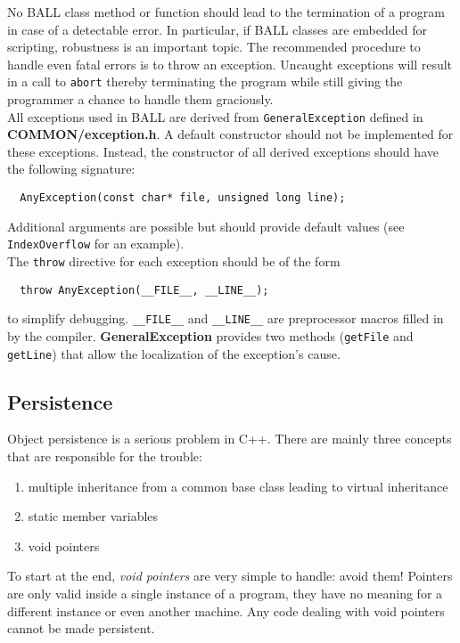 \documentclass[a4paper,10pt]{article}
\begin{document}
No BALL class method or function should lead to the termination of a program
in case of a detectable error. In particular, if BALL classes are embedded 
for scripting, robustness is an important topic. The recommended
procedure to handle even fatal errors is to throw an exception. Uncaught
exceptions will result in a call to {\tt abort} thereby terminating the
program while still giving the programmer a chance to handle them graciously.\\
All exceptions used in BALL are derived from {\tt GeneralException}
defined in {\bf COMMON/exception.h}. A default constructor should not be
implemented for these exceptions. Instead, the constructor of all derived
exceptions should have the following signature:
\begin{verbatim}
  AnyException(const char* file, unsigned long line);
\end{verbatim}
Additional arguments are possible but should provide default values (see
{\tt IndexOverflow} for an example).\\
The {\tt throw} directive for each exception should be of the form
\begin{verbatim}
  throw AnyException(__FILE__, __LINE__);
\end{verbatim}
to simplify debugging. {\tt \_\_FILE\_\_} and {\tt \_\_LINE\_\_} are preprocessor
macros filled in by the compiler. {\bf GeneralException} provides two methods
({\tt getFile} and {\tt getLine}) that allow the localization of the
exception's cause.\\


\subsection{Persistence}

Object persistence is a serious problem in C++. There are mainly three
concepts that are responsible for the trouble:
\begin{enumerate}
	\item multiple inheritance from a common base class leading to virtual
		inheritance
	\item static member variables
	\item void pointers
\end{enumerate}

To start at the end, {\em void pointers} are very simple to handle: avoid them!
Pointers are only valid inside a single instance of a program, they have no
meaning for a different instance or even another machine. Any code dealing
with void pointers cannot be made persistent.
\end{document}
